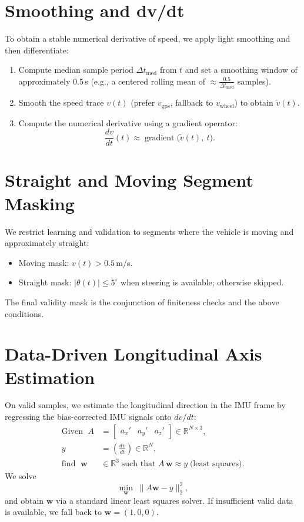 \documentclass[11pt,a4paper]{article}
\begin{document}
\section{Smoothing and dv/dt}
To obtain a stable numerical derivative of speed, we apply light smoothing and then differentiate:
\begin{enumerate}
  \item Compute median sample period $\Delta t_\text{med}$ from $t$ and set a smoothing window of approximately 0.5\,s (e.g., a centered rolling mean of $\approx \frac{0.5}{\Delta t_\text{med}}$ samples).
  \item Smooth the speed trace $v(t)$ (prefer $v_\text{gps}$, fallback to $v_\text{wheel}$) to obtain $\tilde{v}(t)$.
  \item Compute the numerical derivative using a gradient operator:\\
  $$ \frac{dv}{dt}(t) \approx \operatorname{gradient}\big( \tilde{v}(t),~ t \big). $$
\end{enumerate}

\section{Straight and Moving Segment Masking}
We restrict learning and validation to segments where the vehicle is moving and approximately straight:
\begin{itemize}
  \item Moving mask: $v(t) > 0.5$\,m/s.
  \item Straight mask: $|\theta(t)| \le 5^\circ$ when steering is available; otherwise skipped.
\end{itemize}
The final validity mask is the conjunction of finiteness checks and the above conditions.

\section{Data-Driven Longitudinal Axis Estimation}
On valid samples, we estimate the longitudinal direction in the IMU frame by regressing the bias-corrected IMU signals onto $dv/dt$:
\begin{align*}
  \text{Given } \; A &= \begin{bmatrix} a_x' & a_y' & a_z' \end{bmatrix} \in \mathbb{R}^{N\times 3}, \\
  y &= \left( \frac{dv}{dt} \right) \in \mathbb{R}^{N}, \\
  \text{find } \; \mathbf{w} &\in \mathbb{R}^3 \; \text{such that } A\,\mathbf{w} \approx y \; \text{(least squares).}
\end{align*}
We solve
$$ \min_{\mathbf{w}} \; \| A\mathbf{w} - y \|_2^2, $$
and obtain $\mathbf{w}$ via a standard linear least squares solver. If insufficient valid data is available, we fall back to $\mathbf{w} = (1, 0, 0)$.
\end{document}
